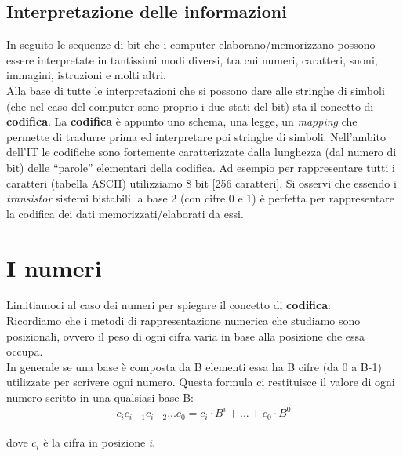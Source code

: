 \subsection{Interpretazione delle informazioni} In seguito le sequenze di bit che i computer elaborano/memorizzano possono essere interpretate in tantissimi modi diversi, tra cui numeri, caratteri, suoni, immagini, istruzioni e molti altri.\\
Alla base di tutte le interpretazioni che si possono dare alle stringhe di simboli (che nel caso del computer sono proprio i due stati del bit) sta il concetto di \textbf{codifica}. La \textbf{codifica} è appunto uno schema, una legge, un \textit{mapping} che permette di tradurre prima ed interpretare poi stringhe di simboli.
Nell’ambito dell’IT le codifiche sono fortemente caratterizzate dalla lunghezza (dal numero di bit) delle “parole” elementari della codifica. Ad esempio per rappresentare tutti i caratteri (tabella ASCII) utilizziamo  8 bit [256 caratteri].
Si osservi che essendo i \textit{transistor} sistemi bistabili la base 2 (con cifre 0 e 1) è perfetta per rappresentare la codifica dei dati memorizzati/elaborati da essi.
\section{I numeri}
Limitiamoci al caso dei numeri per spiegare il concetto di \textbf{codifica}:\\
Ricordiamo che i  metodi di rappresentazione numerica che studiamo sono posizionali, ovvero il peso di ogni cifra varia in base alla posizione che essa  occupa.\\
In generale se una base è composta da B elementi essa ha B cifre (da 0 a B-1) utilizzate per scrivere ogni numero.
Questa formula ci restituisce il valore di ogni numero scritto in una qualsiasi base B:\\
\[c_{i} c_{i-1} c_{i-2}... c_{0}=c_{i}\cdot B^{i}+...+c_{0}\cdot B^{0}\]\\
dove $c_{i}$ è la cifra in posizione \textit{i}.


